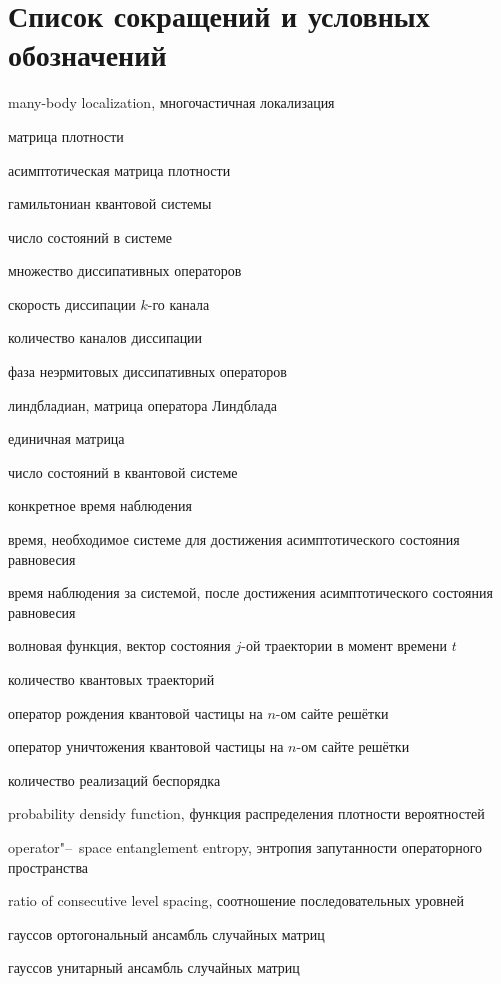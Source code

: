 \chapter*{Список сокращений и условных обозначений} %
\begin{description}[align=right,leftmargin=3.5cm]
\item[MBL] many-body localization, многочастичная локализация
\item[\(\rho\)] матрица плотности
\item[\(\rho^A\)] асимптотическая матрица плотности
\item[\(H\)] гамильтониан квантовой системы
\item[\(S\)] число состояний в системе
\item[\(\{V_k\}\)] множество диссипативных операторов
\item[\(\gamma_k\)] скорость диссипации \(k\)-го канала
\item[\(K\)] количество каналов диссипации
\item[\(\alpha\)] фаза неэрмитовых диссипативных операторов
\item[\(L\)] линдбладиан, матрица оператора Линдблада
\item[\(\idmtx\)] единичная матрица
\item[\(N\)] число состояний в квантовой системе
\item[\(t^C\)] конкретное время наблюдения
\item[\(t^A\)] время, необходимое системе для достижения асимптотического состояния равновесия
\item[\(t^O\)] время наблюдения за системой, после достижения асимптотического состояния равновесия
\item[\(| \psi_j (t) \rangle\)] волновая функция, вектор состояния \(j\)-ой траектории в момент времени \(t\)
\item[\(M_r\)] количество квантовых траекторий
\item[\(b_n\)] оператор рождения квантовой частицы на \(n\)-ом сайте решётки
\item[\(b^\dagger_n\)] оператор уничтожения квантовой частицы на \(n\)-ом сайте решётки
\item[\(N_r\)] количество реализаций беспорядка
\item[PDF] probability densidy function, функция распределения плотности вероятностей
\item[OSEE, \(S^\natural\)] operator"--~space entanglement entropy, энтропия запутанности операторного пространства
\item[RCLS,  \(r\)] ratio of consecutive level spacing, соотношение последовательных уровней
\item[GOE] гауссов ортогональный ансамбль случайных матриц
\item[GUE] гауссов унитарный ансамбль случайных матриц
\end{description}
